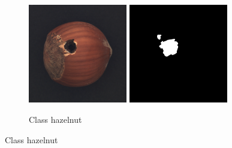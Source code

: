 \begin{figure}[ht]
\begin{subfigure}[b]{0.3\textwidth}
    \end{subfigure}
    \hfill
    \begin{subfigure}[b]{0.3\textwidth}
        \centering
        \includegraphics[width=0.475\textwidth]{figures/mvtecadexampleimages/hazelnut017.png}
        \includegraphics[width=0.475\textwidth]{figures/mvtecadexampleimages/hazelnut017_mask.png}
        \caption*{Class hazelnut}


\end{subfigure}
\end{figure}
